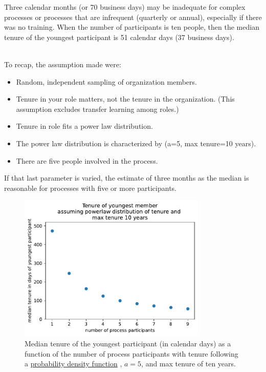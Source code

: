 Three calendar months (or 70 business days) may be inadequate for complex processes or processes that are infrequent (quarterly or annual), especially if there was no training. When the number of participants is ten people, then the median tenure of the youngest participant is 51 calendar days (37 business days).

\ \\

To recap, the assumption made were:
\begin{itemize}
    \item Random, independent sampling of organization members. 
    \item Tenure in your role matters, not the tenure in the organization. (This assumption excludes transfer learning among roles.)
    \item Tenure in role fits a power law distribution.
    \item The power law distribution is characterized by (a=5, max tenure=10 years). 
    \item There are five people involved in the process.
\end{itemize}
If that last parameter is varied, the estimate of three months as the median  is reasonable for processes with five or more participants.

\begin{figure}[!htb]  %
    \centering
    \includegraphics[width=0.8\textwidth]{images/tenure_power_distribution_a5_with_max_tenure10.pdf}
    \caption{Median tenure of the youngest participant (in calendar days) as a function of the number of process participants with tenure following a \href{https://en.wikipedia.org/wiki/Probability_density_function}{probability density function}
    , $a=5$, and max tenure of ten years.}
    \label{fig:tenure-powerlaw-5-participants}
\end{figure}


